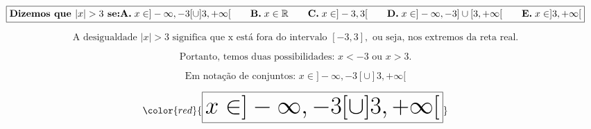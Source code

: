 

\[
\boxed{\textbf{Dizemos que } |x| > 3 \textbf{ se:} \\
\\
\textbf{A.} \; x \in ] -\infty, -3[ \cup ]3, +\infty[ 
\quad\quad
\textbf{B.} \; x \in \mathbb{R} 
\quad\quad
\textbf{C.} \; x \in ] -3, 3[ 
\quad\quad
\textbf{D.} \; x \in ] -\infty, -3] \cup [3, +\infty[ 
\quad\quad
\textbf{E.} \; x \in ]3, +\infty[ }
\]





\[
\text{A desigualdade } |x| > 3 \text{ significa que x está fora do intervalo } [-3, 3], \text{ ou seja, nos extremos da reta real.}
\]





\[
\text{Portanto, temos duas possibilidades: } x < -3 \text{ ou } x > 3.
\]





\[
\text{Em notação de conjuntos: } x \in ] -\infty, -3[ \cup ]3, +\infty[
\]





\[
\color{red}{\Huge \boxed{x \in ] -\infty, -3[ \cup ]3, +\infty[}}
\]


